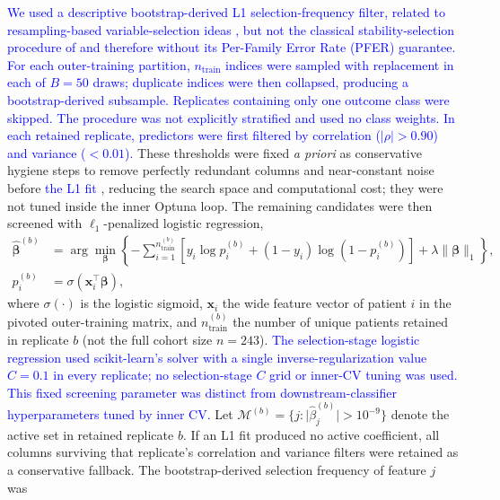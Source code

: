 \documentclass[review]{elsarticle}
\newcommand{\code}[1]{\texttt{\seqsplit{#1}}}
\newcommand{\corrigir}[2]{%
	\textcolor{red}{\sout{#1}} %
	\textcolor{blue}{#2}%
}
\begin{document}
	\corrigir{}{We used a descriptive bootstrap-derived L1 selection-frequency filter, related to resampling-based variable-selection ideas \citep{bach-2008,meinshausen-2010}, but not the classical stability-selection procedure of \citet{meinshausen-2010} and therefore without its Per-Family Error Rate (PFER) guarantee. For each outer-training partition, $n_{\mathrm{train}}$ indices were sampled with replacement in each of $B=50$ draws; duplicate indices were then collapsed, producing a bootstrap-derived subsample. Replicates containing only one outcome class were skipped. The procedure was not explicitly stratified and used no class weights. In each retained replicate, predictors were first filtered by correlation ($|\rho|>0.90$) and variance ($<0.01$).} These thresholds were fixed \emph{a priori} as conservative hygiene steps to remove perfectly redundant columns and near-constant noise before \corrigir{}{the L1 fit}, reducing the search space and computational cost; they were not tuned inside the inner Optuna loop. The remaining candidates were then screened with $\ell_1$-penalized logistic regression,
	\begin{equation}
		\begin{aligned}
			\hat{\boldsymbol{\beta}}^{(b)}
			&= \arg\min_{\boldsymbol{\beta}}
			\left\{
			-\sum_{i=1}^{n_{\mathrm{train}}^{(b)}}
			\left[
			y_i \log p_i^{(b)} + (1-y_i)\log\!\left(1-p_i^{(b)}\right)
			\right]
			+ \lambda \|\boldsymbol{\beta}\|_1
			\right\}, \\
			p_i^{(b)} &= \sigma\!\left(\mathbf{x}_i^{\top}\boldsymbol{\beta}\right),
		\end{aligned}
		\label{eq:l1-logistic}
	\end{equation}
	where $\sigma(\cdot)$ is the logistic sigmoid, $\mathbf{x}_i$ the wide feature vector of patient $i$ in the pivoted outer-training matrix, and $n_{\mathrm{train}}^{(b)}$ the number of unique patients retained in replicate $b$ (not the full cohort size $n=243$). \corrigir{}{The selection-stage logistic regression used scikit-learn's \code{SAGA} solver with a single inverse-regularization value $C=0.1$ in every replicate; no selection-stage $C$ grid or inner-CV tuning was used. This fixed screening parameter was distinct from downstream-classifier hyperparameters tuned by inner CV.} Let $\mathcal{M}^{(b)} = \{j : \lvert\hat{\beta}^{(b)}_j\rvert>10^{-9}\}$ denote the active set in retained replicate $b$. If an L1 fit produced no active coefficient, all columns surviving that replicate's correlation and variance filters were retained as a conservative fallback. The bootstrap-derived selection frequency of feature $j$ was
\end{document}
